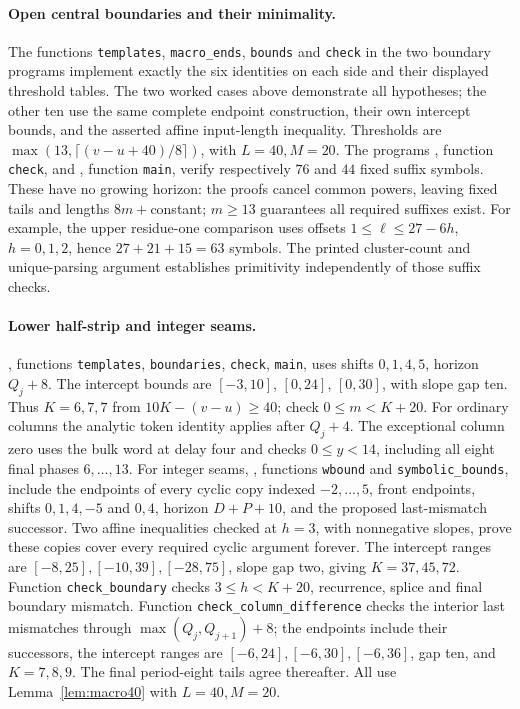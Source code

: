 \documentclass[11pt]{article}
\theoremstyle{remark}\newtheorem{remark}[theorem]{Remark}
\begin{document}
\paragraph{Open central boundaries and their minimality.}
The functions \texttt{templates}, \texttt{macro\_ends}, \texttt{bounds}
and \texttt{check} in the two boundary programs implement exactly the
six identities on each side and their displayed threshold tables.
The two worked cases above demonstrate all hypotheses; the other ten
use the same complete endpoint construction, their own intercept bounds,
and the asserted affine input-length inequality. Thresholds are
$\max(13,\lceil(v-u+40)/8\rceil)$, with $L=40,M=20$.
The programs , function \texttt{check}, and
, function \texttt{main}, verify respectively
$76$ and $44$ fixed suffix symbols. These have no growing horizon:
the proofs cancel common powers, leaving fixed tails and lengths
$8m+$constant; $m\ge13$ guarantees all required suffixes exist.
For example, the upper residue-one comparison uses offsets
$1\le\ell\le27-6h$, $h=0,1,2$, hence $27+21+15=63$ symbols.
The printed cluster-count and unique-parsing argument establishes
primitivity independently of those suffix checks.

\paragraph{Lower half-strip and integer seams.}
, functions \texttt{templates},
\texttt{boundaries}, \texttt{check}, \texttt{main}, uses shifts
$0,1,4,5$, horizon $Q_j+8$. The intercept bounds are
$[-3,10]$, $[0,24]$, $[0,30]$, with slope gap ten.
Thus $K=6,7,7$ from $10K-(v-u)\ge40$; check $0\le m<K+20$.
For ordinary columns the analytic token identity applies after $Q_j+4$.
The exceptional column zero uses the bulk word at delay four and checks
$0\le y<14$, including all eight final phases $6,\ldots,13$.
For integer seams, , functions
\texttt{wbound} and \texttt{symbolic\_bounds}, include the endpoints of
every cyclic copy indexed $-2,\ldots,5$, front endpoints, shifts
$0,1,4,-5$ and $0,4$, horizon $D+P+10$, and the proposed last-mismatch
successor. Two affine inequalities checked at $h=3$, with nonnegative
slopes, prove these copies cover every required cyclic argument forever.
The intercept ranges are $[-8,25],[-10,39],[-28,75]$, slope gap two,
giving $K=37,45,72$. Function \texttt{check\_boundary} checks
$3\le h<K+20$, recurrence, splice and final boundary mismatch.
Function \texttt{check\_column\_difference} checks the interior last
mismatches through $\max(Q_j,Q_{j+1})+8$; the endpoints include their
successors, the intercept ranges are $[-6,24],[-6,30],[-6,36]$,
gap ten, and $K=7,8,9$. The final period-eight tails agree thereafter.
All use Lemma~\ref{lem:macro40} with $L=40,M=20$.
\end{document}
